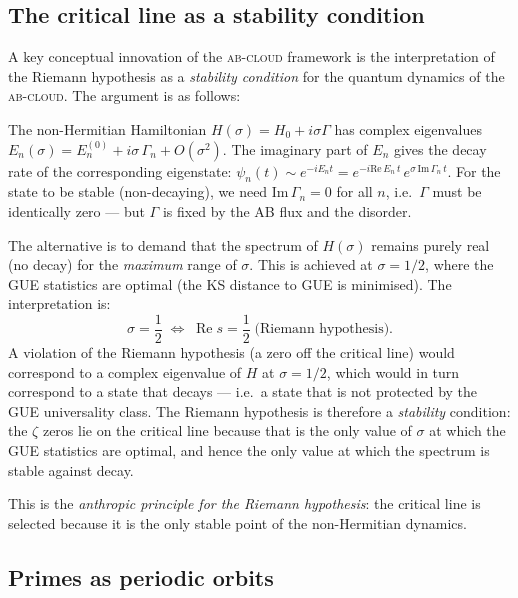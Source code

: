 \documentclass[11pt,a4paper]{article}
\theoremstyle{plain}
\theoremstyle{definition}
\theoremstyle{remark}
\newcommand{\Abcloud}{\textsc{ab-cloud}}
\begin{document}
\subsection{The critical line as a stability condition}

A key conceptual innovation of the \Abcloud{} framework is the interpretation of the Riemann hypothesis as a \emph{stability condition} for the quantum dynamics of the \Abcloud{}. The argument is as follows:

The non-Hermitian Hamiltonian $H(\sigma) = H_0 + i\sigma\Gamma$ has complex eigenvalues $E_n(\sigma) = E_n^{(0)} + i\sigma\,\Gamma_n + O(\sigma^2)$. The imaginary part of $E_n$ gives the decay rate of the corresponding eigenstate: $\psi_n(t) \sim e^{-iE_n t} = e^{-i\mathrm{Re}\,E_n\,t}\,e^{\sigma\,\mathrm{Im}\,\Gamma_n\,t}$. For the state to be stable (non-decaying), we need $\mathrm{Im}\,\Gamma_n = 0$ for all $n$, i.e.\ $\Gamma$ must be identically zero — but $\Gamma$ is fixed by the AB flux and the disorder.

The alternative is to demand that the spectrum of $H(\sigma)$ remains purely real (no decay) for the \emph{maximum} range of $\sigma$. This is achieved at $\sigma = 1/2$, where the GUE statistics are optimal (the KS distance to GUE is minimised). The interpretation is:
\begin{equation}
    \sigma = \frac{1}{2} \;\Longleftrightarrow\; \operatorname{Re}s = \frac{1}{2}\;\text{(Riemann hypothesis)}.
\end{equation}
A violation of the Riemann hypothesis (a zero off the critical line) would correspond to a complex eigenvalue of $H$ at $\sigma = 1/2$, which would in turn correspond to a state that decays — i.e.\ a state that is not protected by the GUE universality class. The Riemann hypothesis is therefore a \emph{stability} condition: the $\zeta$ zeros lie on the critical line because that is the only value of $\sigma$ at which the GUE statistics are optimal, and hence the only value at which the spectrum is stable against decay.

This is the \emph{anthropic principle for the Riemann hypothesis}: the critical line is selected because it is the only stable point of the non-Hermitian dynamics.

\subsection{Primes as periodic orbits}
\end{document}
